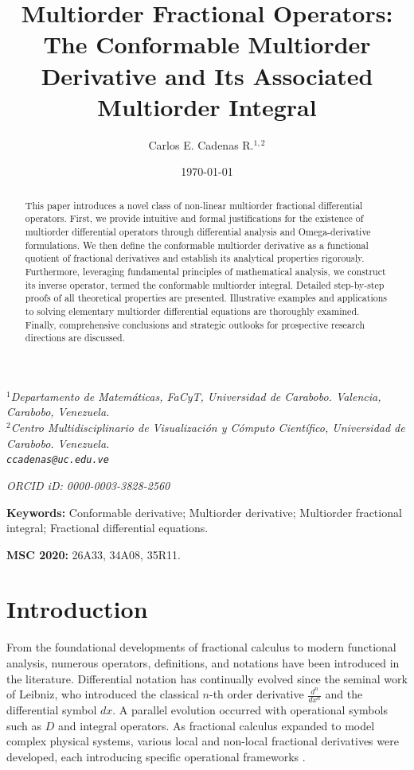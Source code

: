 \documentclass[oneside,10pt]{article}
\title{\textbf{Multiorder Fractional Operators: The Conformable Multiorder Derivative and Its Associated Multiorder Integral}}
\author{Carlos E. Cadenas R.$^{1,2}$}
\date{\today}
\theoremstyle{plain}
\theoremstyle{definition}
\begin{document}
\maketitle

\begin{center}
\textit{$^1$Departamento de Matem\'aticas, FaCyT, Universidad de Carabobo. Valencia, Carabobo, Venezuela.\\
$^2$Centro Multidisciplinario de Visualizaci\'on y C\'omputo Cient\'ifico, Universidad de Carabobo. Venezuela.\\
\texttt{ccadenas@uc.edu.ve}}

\textit{ORCID iD: 0000-0003-3828-2560}
\end{center}

\begin{abstract}
This paper introduces a novel class of non-linear multiorder fractional differential operators. First, we provide intuitive and formal justifications for the existence of multiorder differential operators through differential analysis and Omega-derivative formulations. We then define the conformable multiorder derivative as a functional quotient of fractional derivatives and establish its analytical properties rigorously. Furthermore, leveraging fundamental principles of mathematical analysis, we construct its inverse operator, termed the conformable multiorder integral. Detailed step-by-step proofs of all theoretical properties are presented. Illustrative examples and applications to solving elementary multiorder differential equations are thoroughly examined. Finally, comprehensive conclusions and strategic outlooks for prospective research directions are discussed.
\end{abstract}

\textbf{Keywords:} Conformable derivative; Multiorder derivative; Multiorder fractional integral; Fractional differential equations.

\textbf{MSC 2020:} 26A33, 34A08, 35R11.

\section{Introduction}

From the foundational developments of fractional calculus to modern functional analysis, numerous operators, definitions, and notations have been introduced in the literature. Differential notation has continually evolved since the seminal work of Leibniz, who introduced the classical $n$-th order derivative $\frac{d^n}{dx^n}$ and the differential symbol $dx$. A parallel evolution occurred with operational symbols such as $D$ and integral operators. As fractional calculus expanded to model complex physical systems, various local and non-local fractional derivatives were developed, each introducing specific operational frameworks \cite{Atangana2025, Cajori1923, David2011, Machado2011, Ross1977}.
\end{document}
